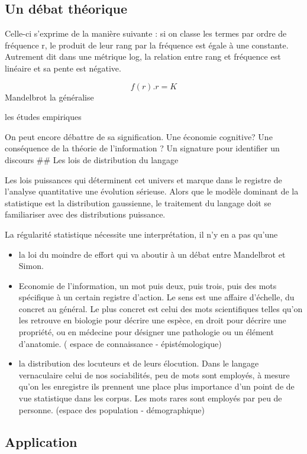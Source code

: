 \documentclass[
  letterpaper,
  DIV=11,
  numbers=noendperiod]{scrreprt}
\begin{document}
\subsection{Un débat théorique}\label{un-duxe9bat-thuxe9orique}

Celle-ci s'exprime de la manière suivante : si on classe les termes par
ordre de fréquence r, le produit de leur rang par la fréquence est égale
à une constante. Autrement dit dans une métrique log, la relation entre
rang et fréquence est linéaire et sa pente est négative.

\[f(r).{r}={K} \] Mandelbrot la généralise

les études empiriques

On peut encore débattre de sa signification. Une économie cognitive? Une
conséquence de la théorie de l'information ? Un signature pour
identifier un discours \#\# Les lois de distribution du langage

Les lois puissances qui déterminent cet univers et marque dans le
registre de l'analyse quantitative une évolution sérieuse. Alors que le
modèle dominant de la statistique est la distribution gaussienne, le
traitement du langage doit se familiariser avec des distributions
puissance.

La régularité statistique nécessite une interprétation, il n'y en a pas
qu'une

\begin{itemize}
\item
  la loi du moindre de effort qui va aboutir à un débat entre Mandelbrot
  et Simon.
\item
  Economie de l'information, un mot puis deux, puis trois, puis des mots
  spécifique à un certain registre d'action. Le sens est une affaire
  d'échelle, du concret au général. Le plus concret est celui des mots
  scientifiques telles qu'on les retrouve en biologie pour décrire une
  espèce, en droit pour décrire une propriété, ou en médecine pour
  désigner une pathologie ou un élément d'anatomie. ( espace de
  connaissance - épistémologique)
\item
  la distribution des locuteurs et de leurs élocution. Dans le langage
  vernaculaire celui de nos sociabilités, peu de mots sont employés, à
  mesure qu'on les enregistre ils prennent une place plus importance
  d'un point de de vue statistique dans les corpus. Les mots rares sont
  employés par peu de personne. (espace des population - démographique)
\end{itemize}

\subsection{Application}\label{application}
\end{document}
